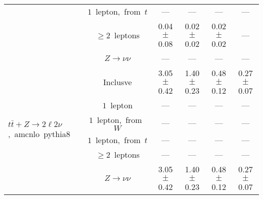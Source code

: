 \documentclass{article}
\begin{document}
\begin{longtable}{|l|c|c|c|c|c|}
 & $1$~lepton,~from~$t$  & ---  & ---  & ---  & --- \\* 
 & $\ge2$~leptons  & 0.04 $\pm$ 0.08  & 0.02 $\pm$ 0.02  & 0.02 $\pm$ 0.02  & --- \\* 
 & $Z\rightarrow\nu\nu$  & ---  & ---  & ---  & --- \\* 
\hline 
\multirow{6}{*}{$t\bar{t}+Z{\rightarrow}2{\ell}2{\nu}$,~amcnlo~pythia8} & Inclusve  & 3.05 $\pm$ 0.42  & 1.40 $\pm$ 0.23  & 0.48 $\pm$ 0.12  & 0.27 $\pm$ 0.07 \\* 
 & $1$~lepton  & ---  & ---  & ---  & --- \\* 
 & $1$~lepton,~from~$W$  & ---  & ---  & ---  & --- \\* 
 & $1$~lepton,~from~$t$  & ---  & ---  & ---  & --- \\* 
 & $\ge2$~leptons  & ---  & ---  & ---  & --- \\* 
 & $Z\rightarrow\nu\nu$  & 3.05 $\pm$ 0.42  & 1.40 $\pm$ 0.23  & 0.48 $\pm$ 0.12  & 0.27 $\pm$ 0.07 \\* 
\hline 
\end{longtable} 

 
 
 
 
\pagebreak 

 
 
 
 
\end{document}
